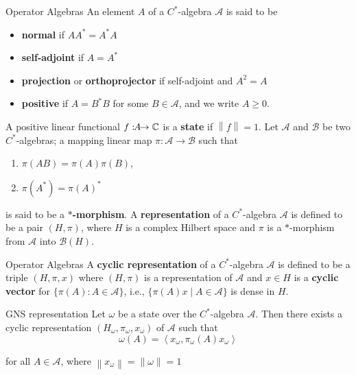 \documentclass{beamer}
\begin{document}
        \begin{frame}{Operator Algebras}
            An element \(A\) of a \(C^\ast\)-algebra \(\mathcal{A}\) is said to be
            \begin{itemize}
                \item \textbf{normal} if \(AA^\ast=A^\ast A\)
                \item \textbf{self-adjoint} if \(A=A^\ast\)
                \item \textbf{projection} or \textbf{orthoprojector} if self-adjoint and \(A^2 = A\)
                \item \textbf{positive} if \(A=B^\ast B\) for some \(B \in \mathcal{A}\), and we write \(A \ge 0\).
            \end{itemize}
            A positive linear functional \(f:\mathclap{A} \to \mathbb{C}\) is a \textbf{state} if \(\left \lVert f \right \rVert =1\).
            Let \(\mathcal{A}\) and \(\mathcal{B}\) be two \(C^\ast\)-algebras; a mapping linear map \(\pi:\mathcal{A} \to \mathcal{B}\) such that
            \begin{enumerate}
                \item \(\pi(AB)=\pi(A)\pi(B)\),
                \item \(\pi(A^\ast)=\pi(A)^\ast\)
            \end{enumerate}
            is said to be a \textbf{\(\ast\)-morphism}. A \textbf{representation} of a \(C^\ast\)-algebra \(\mathcal{A}\) is defined to be a pair \((H,\pi)\), where \(H\) is a complex Hilbert space and \(\pi\) is a \(\ast\)-morphism from \(\mathcal{A}\) into \(\mathcal{B}(H)\).
        \end{frame}
        \begin{frame}{Operator Algebras}
            A \textbf{cyclic representation} of a \(C^\ast\)-algebra \(\mathcal{A}\) is defined to be a triple \((H,\pi,x)\) where \((H,\pi)\) is a representation of \(\mathcal{A}\) and \(x \in H\) is a \textbf{cyclic vector} for \(\{\pi(A): A \in \mathcal{A}\}\), i.e., \(\{\pi(A)x \mid A \in \mathcal{A}\}\) is dense in \(H\).
            \begin{block}{GNS representation}
                Let \(\omega\) be a state over the \(C^\ast\)-algebra \(\mathcal{A}\). Then there exists a cyclic representation \((H_{\omega},\pi_{\omega},x_{\omega})\) of \(\mathcal{A}\) such that
                \[\omega(A) = \left \langle x_{\omega},\pi_{\omega}(A)x_{\omega} \right \rangle\]
            \end{block}
            for all \(A \in \mathcal{A}\), where \(\left \lVert x_{\omega} \right \rVert=\left \lVert \omega \right \rVert=1\)
        \end{frame}
\end{document}
